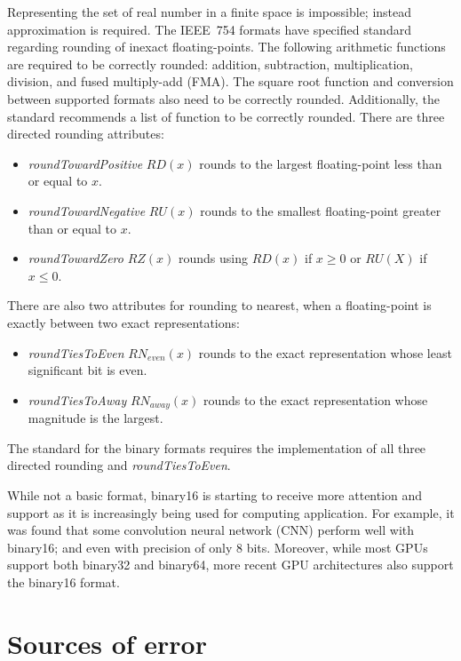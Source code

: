 Representing the set of real number in a finite space is impossible; instead approximation is required.
The IEEE~754 formats have specified standard regarding rounding of inexact floating-points.
The following arithmetic functions are required to be correctly rounded: addition, subtraction, multiplication, division, and fused multiply-add (FMA).
The square root function and conversion between supported formats also need to be correctly rounded.
Additionally, the standard recommends a list of function to be correctly rounded. %
There are three directed rounding attributes:
\begin{itemize}
	\item \textit{roundTowardPositive} $RD(x)$ rounds to the largest floating-point less than or equal to $x$.
	\item \textit{roundTowardNegative} $RU(x)$ rounds to the smallest floating-point greater than or equal to $x$.
	\item \textit{roundTowardZero} $RZ(x)$ rounds using $RD(x)$ if $x \ge 0$ or $RU(X)$ if $x \le 0$.
\end{itemize}
There are also two attributes for rounding to nearest, when a floating-point is exactly between two exact representations:
\begin{itemize}
	\item \textit{roundTiesToEven} $RN_{even}(x)$ rounds to the exact representation whose least significant bit is even.
	\item \textit{roundTiesToAway} $RN_{away}(x)$ rounds to the exact representation whose magnitude is the largest.
\end{itemize}
The standard for the binary formats requires the implementation of all three directed rounding and \textit{roundTiesToEven}.

While not a basic format, binary16 is starting to receive more attention and support as it is increasingly being used for computing application.
For example, it was found that some convolution neural network (CNN) perform well with binary16; and even with precision of only 8 bits.
Moreover, while most GPUs support both binary32 and binary64, more recent GPU architectures also support the binary16 format.

\section{Sources of error}
\begin{comment}
- rounding
- double rounding
- cancellation
- overflow & underflow
- accumulation
\end{comment}
